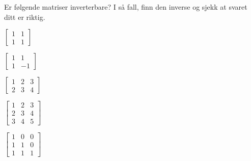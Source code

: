 \begin{oppgave}
Er følgende matriser inverterbare? I så fall, finn den inverse og
sjekk at svaret ditt er riktig.

\vspace{-8pt}\noindent
\begin{minipage}[t]{0.2\textwidth}
\begin{punkt}
$\begin{bmatrix}
1 & 1\\
1 & 1
\end{bmatrix}$
\end{punkt}
\begin{punkt}
$\begin{bmatrix}
1 & 1\\
1 & -1
\end{bmatrix}$
\end{punkt}
\begin{punkt}
$\begin{bmatrix}
1 & 2 & 3 \\
2 & 3 & 4
\end{bmatrix}$
\end{punkt}
\end{minipage}
\begin{minipage}[t]{0.2\textwidth}
\begin{punkt}
$\begin{bmatrix}
1 & 2 & 3\\
2 & 3 & 4\\
3 & 4 & 5
\end{bmatrix}$
\end{punkt}
\begin{punkt}
$\begin{bmatrix}
1 & 0 & 0\\
1 & 1 & 0\\
1 & 1 & 1
\end{bmatrix}$
\end{punkt}
\end{minipage}
\end{oppgave}


